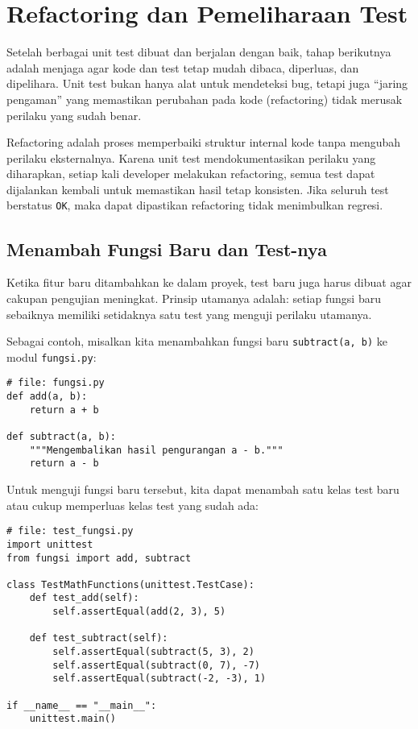 \section{Refactoring dan Pemeliharaan Test}

Setelah berbagai unit test dibuat dan berjalan dengan baik, tahap berikutnya adalah menjaga agar kode dan test tetap mudah dibaca, diperluas, dan dipelihara.  
Unit test bukan hanya alat untuk mendeteksi bug, tetapi juga “jaring pengaman” yang memastikan perubahan pada kode (refactoring) tidak merusak perilaku yang sudah benar.

Refactoring adalah proses memperbaiki struktur internal kode tanpa mengubah perilaku eksternalnya.  
Karena unit test mendokumentasikan perilaku yang diharapkan, setiap kali developer melakukan refactoring, semua test dapat dijalankan kembali untuk memastikan hasil tetap konsisten.  
Jika seluruh test berstatus \texttt{OK}, maka dapat dipastikan refactoring tidak menimbulkan regresi.

\subsection{Menambah Fungsi Baru dan Test-nya}

Ketika fitur baru ditambahkan ke dalam proyek, test baru juga harus dibuat agar cakupan pengujian meningkat.  
Prinsip utamanya adalah: setiap fungsi baru sebaiknya memiliki setidaknya satu test yang menguji perilaku utamanya.

Sebagai contoh, misalkan kita menambahkan fungsi baru \texttt{subtract(a, b)} ke modul \texttt{fungsi.py}:

\begin{lstlisting}[style=PythonStyle, caption={Menambahkan fungsi baru}, label={lst:fungsi-subtract}]
# file: fungsi.py
def add(a, b):
    return a + b

def subtract(a, b):
    """Mengembalikan hasil pengurangan a - b."""
    return a - b
\end{lstlisting}

Untuk menguji fungsi baru tersebut, kita dapat menambah satu kelas test baru atau cukup memperluas kelas test yang sudah ada:

\begin{lstlisting}[style=PythonStyle, caption={Menambahkan test untuk fungsi baru}, label={lst:test-subtract}]
# file: test_fungsi.py
import unittest
from fungsi import add, subtract

class TestMathFunctions(unittest.TestCase):
    def test_add(self):
        self.assertEqual(add(2, 3), 5)

    def test_subtract(self):
        self.assertEqual(subtract(5, 3), 2)
        self.assertEqual(subtract(0, 7), -7)
        self.assertEqual(subtract(-2, -3), 1)

if __name__ == "__main__":
    unittest.main()
\end{lstlisting}


